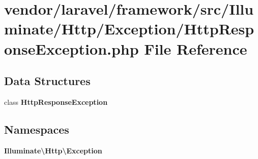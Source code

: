 \section{vendor/laravel/framework/src/\+Illuminate/\+Http/\+Exception/\+Http\+Response\+Exception.php File Reference}
\label{_http_response_exception_8php}
\subsection*{Data Structures}
\begin{DoxyCompactItemize}
\item 
class {\bf Http\+Response\+Exception}
\end{DoxyCompactItemize}
\subsection*{Namespaces}
\begin{DoxyCompactItemize}
\item 
 {\bf Illuminate\textbackslash{}\+Http\textbackslash{}\+Exception}
\end{DoxyCompactItemize}

